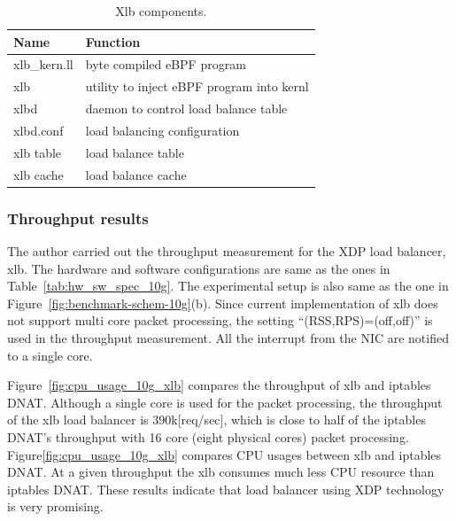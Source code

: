 \begin{table}[h]
  \centering
  \begin{tabular}{|l|l|}
    \hline
    Name & Function \\ \hline
    xlb\_kern.ll & byte compiled eBPF program  \\ \hline
    xlb & utility to inject eBPF program into kernl  \\ \hline
    xlbd & daemon to control load balance table  \\ \hline
    xlbd.conf & load balancing configuration  \\ \hline
    xlb table & load balance table  \\ \hline
    xlb cache & load balance cache  \\ \hline
  \end{tabular}

  \par\bigskip
  \centering
  \begin{minipage}{0.9\columnwidth}
    \caption[Xlb components]{
      Xlb components.
    }
    \label{table:xlb-progs}
  \end{minipage}
\end{table}


\subsubsection{Throughput results }

The author carried out the throughput measurement for the XDP load balancer, xlb.
The hardware and software configurations are same as the ones in Table~\ref{tab:hw_sw_spec_10g}.
The experimental setup is also same as the one in Figure~\ref{fig:benchmark-schem-10g}(b).
Since current implementation of xlb does not support multi core packet processing, the setting \enquote{(RSS,RPS)=(off,off)} is used in the throughput measurement.
All the interrupt from the NIC are notified to a single core.

Figure~\ref{fig:cpu_usage_10g_xlb} compares the throughput of xlb and iptables DNAT. 
Although a single core is used for the packet processing, the throughput of the xlb load balancer is 390k[req/sec], which is close to half of the iptables DNAT's throughput with 16 core (eight physical cores) packet processing.
Figure\ref{fig:cpu_usage_10g_xlb} compares CPU usages between xlb and iptables DNAT.
At a given throughput the xlb consumes much less CPU resource than iptables DNAT.
These results indicate that load balancer using XDP technology is very promising.

